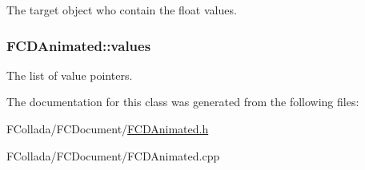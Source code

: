 \label{classFCDAnimated_aca46cbdc7ee7a1b4cf90a5aa6849f4e0}
The target object who contain the float values. \hypertarget{classFCDAnimated_afa9e0b280ba2cd7c18e8454eb296e453}{
\subsubsection[{values}]{ {\bf FCDAnimated::values}}}
\label{classFCDAnimated_afa9e0b280ba2cd7c18e8454eb296e453}
The list of value pointers. 

The documentation for this class was generated from the following files:\begin{DoxyCompactItemize}
\item 
FCollada/FCDocument/\hyperlink{FCDAnimated_8h}{FCDAnimated.h}\item 
FCollada/FCDocument/FCDAnimated.cpp\end{DoxyCompactItemize}
